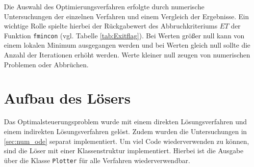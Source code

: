 Die Auswahl des Optimierungsverfahren erfolgte durch numerische Untersuchungen der einzelnen Verfahren und einem Vergleich der Ergebnisse. Ein wichtige Rolle spielte hierbei der Rückgabewert des Abbruchkriteriums $ET$ der Funktion \texttt{fmincon} (vgl. Tabelle \ref{tab:Exitflag}). Bei Werten größer null kann von einem lokalen Minimum ausgegangen werden und bei Werten gleich null sollte die Anzahl der Iterationen erhöht werden. Werte kleiner null zeugen von numerischen Problemen oder Abbrüchen.

%
%

%


\section{Aufbau des Lösers}
Das Optimalsteuerungsproblem wurde mit einem direkten Lösungsverfahren und einem indirekten Lösungsverfahren gelöst. Zudem wurden die Untersuchungen in \autoref{sec:num_ode} separat implementiert. Um viel Code wiederverwenden zu können, sind die Löser mit einer Klassenstruktur implementiert. Hierbei ist die Ausgabe über die Klasse \verb+Plotter+ für alle Verfahren wiederverwendbar.

